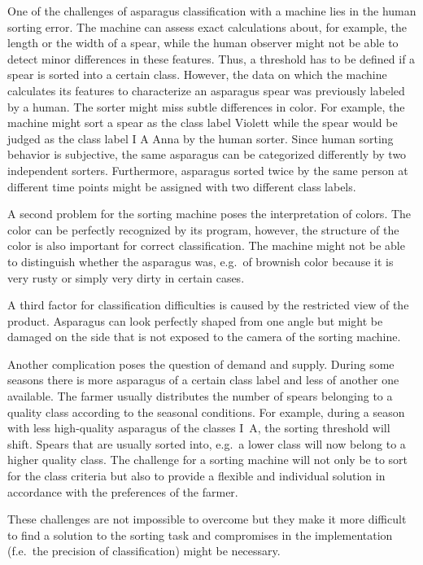 \bigskip
One of the challenges of asparagus classification with a machine lies in the human sorting error. The machine can assess exact calculations about, for example, the length or the width of a spear, while the human observer might not be able to detect minor differences in these features. Thus, a threshold has to be defined if a spear is sorted into a certain class. However, the data on which the machine calculates its features to characterize an asparagus spear was previously labeled by a human. The sorter might miss subtle differences in color. For example, the machine might sort a spear as the class label Violett while the spear would be judged as the class label I A Anna by the human sorter. Since human sorting behavior is subjective, the same asparagus can be categorized differently by two independent sorters. Furthermore, asparagus sorted twice by the same person at different time points might be assigned with two different class labels.

A second problem for the sorting machine poses the interpretation of colors. The color can be perfectly recognized by its program, however, the structure of the color is also important for correct classification. The machine might not be able to distinguish whether the asparagus was, e.g.\ of brownish color because it is very rusty or simply very dirty in certain cases.

A third factor for classification difficulties is caused by the restricted view of the product. Asparagus can look perfectly shaped from one angle but might be damaged on the side that is not exposed to the camera of the sorting machine.

Another complication poses the question of demand and supply. During some seasons there is more asparagus of a certain class label and less of another one available. The farmer usually distributes the number of spears belonging to a quality class according to the seasonal conditions. For example, during a season with less high-quality asparagus of the classes I~A, the sorting threshold will shift. Spears that are usually sorted into, e.g.\ a lower class will now belong to a higher quality class. The challenge for a sorting machine will not only be to sort for the class criteria but also to provide a flexible and individual solution in accordance with the preferences of the farmer.

These challenges are not impossible to overcome but they make it more difficult to find a solution to the sorting task and compromises in the implementation (f.e.\ the precision of classification) might be necessary. 
